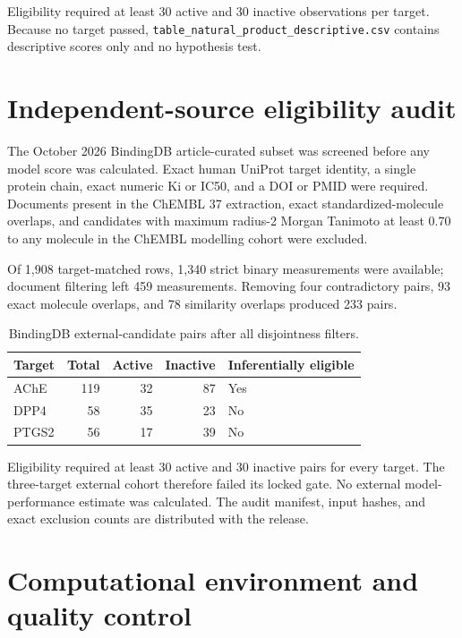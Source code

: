 \documentclass[11pt]{article}
\begin{document}
Eligibility required at least 30 active and 30 inactive observations per target.
Because no target passed, \texttt{table\_natural\_product\_descriptive.csv}
contains descriptive scores only and no hypothesis test.

\section{Independent-source eligibility audit}

The October 2026 BindingDB article-curated subset was screened before any model
score was calculated. Exact human UniProt target identity, a single protein
chain, exact numeric Ki or IC50, and a DOI or PMID were required. Documents
present in the ChEMBL 37 extraction, exact standardized-molecule overlaps, and
candidates with maximum radius-2 Morgan Tanimoto at least 0.70 to any molecule
in the ChEMBL modelling cohort were excluded.

Of 1,908 target-matched rows, 1,340 strict binary measurements were available;
document filtering left 459 measurements. Removing four contradictory pairs,
93 exact molecule overlaps, and 78 similarity overlaps produced 233 pairs.

\begin{table}[ht]
\centering
\caption{BindingDB external-candidate pairs after all disjointness filters.}
\begin{tabular}{lrrrl}
\toprule
Target & Total & Active & Inactive & Inferentially eligible\\
\midrule
AChE & 119 & 32 & 87 & Yes\\
DPP4 & 58 & 35 & 23 & No\\
PTGS2 & 56 & 17 & 39 & No\\
\bottomrule
\end{tabular}
\end{table}

Eligibility required at least 30 active and 30 inactive pairs for every target.
The three-target external cohort therefore failed its locked gate. No external
model-performance estimate was calculated. The audit manifest, input hashes,
and exact exclusion counts are distributed with the release.

\section{Computational environment and quality control}
\end{document}

